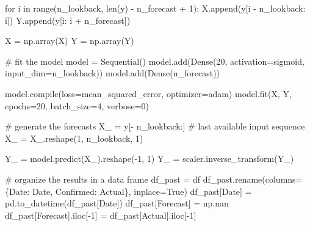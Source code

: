 \documentclass[
  us-letterpaper,
]{scrreprt}
\newenvironment{Shaded}{\begin{snugshade}}{\end{snugshade}}
\newcommand{\BuiltInTok}[1]{\textcolor[rgb]{0.00,0.23,0.31}{#1}}
\newcommand{\CommentTok}[1]{\textcolor[rgb]{0.37,0.37,0.37}{#1}}
\newcommand{\ControlFlowTok}[1]{\textcolor[rgb]{0.00,0.23,0.31}{#1}}
\newcommand{\DecValTok}[1]{\textcolor[rgb]{0.68,0.00,0.00}{#1}}
\newcommand{\KeywordTok}[1]{\textcolor[rgb]{0.00,0.23,0.31}{#1}}
\newcommand{\NormalTok}[1]{\textcolor[rgb]{0.00,0.23,0.31}{#1}}
\newcommand{\OperatorTok}[1]{\textcolor[rgb]{0.37,0.37,0.37}{#1}}
\newcommand{\StringTok}[1]{\textcolor[rgb]{0.13,0.47,0.30}{#1}}
\newcommand{\VariableTok}[1]{\textcolor[rgb]{0.07,0.07,0.07}{#1}}
\theoremstyle{plain}
\theoremstyle{definition}
\theoremstyle{definition}
\theoremstyle{plain}
\theoremstyle{remark}
\begin{document}
\begin{Shaded}
\begin{Highlighting}[]
\ControlFlowTok{for}\NormalTok{ i }\KeywordTok{in} \BuiltInTok{range}\NormalTok{(n\_lookback, }\BuiltInTok{len}\NormalTok{(y) }\OperatorTok{{-}}\NormalTok{ n\_forecast }\OperatorTok{+} \DecValTok{1}\NormalTok{):}
\NormalTok{    X.append(y[i }\OperatorTok{{-}}\NormalTok{ n\_lookback: i])}
\NormalTok{    Y.append(y[i: i }\OperatorTok{+}\NormalTok{ n\_forecast])}

\NormalTok{X }\OperatorTok{=}\NormalTok{ np.array(X)}
\NormalTok{Y }\OperatorTok{=}\NormalTok{ np.array(Y)}

\CommentTok{\# fit the model}
\NormalTok{model }\OperatorTok{=}\NormalTok{ Sequential()}
\NormalTok{model.add(Dense(}\DecValTok{20}\NormalTok{, activation}\OperatorTok{=}\StringTok{\textquotesingle{}sigmoid\textquotesingle{}}\NormalTok{, input\_dim}\OperatorTok{=}\NormalTok{n\_lookback))}
\NormalTok{model.add(Dense(n\_forecast))}

\NormalTok{model.}\BuiltInTok{compile}\NormalTok{(loss}\OperatorTok{=}\StringTok{\textquotesingle{}mean\_squared\_error\textquotesingle{}}\NormalTok{, optimizer}\OperatorTok{=}\StringTok{\textquotesingle{}adam\textquotesingle{}}\NormalTok{)}
\NormalTok{model.fit(X, Y, epochs}\OperatorTok{=}\DecValTok{20}\NormalTok{, batch\_size}\OperatorTok{=}\DecValTok{4}\NormalTok{, verbose}\OperatorTok{=}\DecValTok{0}\NormalTok{)}

\CommentTok{\# generate the forecasts}
\NormalTok{X\_ }\OperatorTok{=}\NormalTok{ y[}\OperatorTok{{-}}\NormalTok{ n\_lookback:]  }\CommentTok{\# last available input sequence}
\NormalTok{X\_ }\OperatorTok{=}\NormalTok{ X\_.reshape(}\DecValTok{1}\NormalTok{, n\_lookback, }\DecValTok{1}\NormalTok{)}

\NormalTok{Y\_ }\OperatorTok{=}\NormalTok{ model.predict(X\_).reshape(}\OperatorTok{{-}}\DecValTok{1}\NormalTok{, }\DecValTok{1}\NormalTok{)}
\NormalTok{Y\_ }\OperatorTok{=}\NormalTok{ scaler.inverse\_transform(Y\_)}

\CommentTok{\# organize the results in a data frame}
\NormalTok{df\_past }\OperatorTok{=}\NormalTok{ df}
\NormalTok{df\_past.rename(columns}\OperatorTok{=}\NormalTok{\{}\StringTok{\textquotesingle{}Date\textquotesingle{}}\NormalTok{: }\StringTok{\textquotesingle{}Date\textquotesingle{}}\NormalTok{, }\StringTok{\textquotesingle{}Confirmed\textquotesingle{}}\NormalTok{: }\StringTok{\textquotesingle{}Actual\textquotesingle{}}\NormalTok{\}, inplace}\OperatorTok{=}\VariableTok{True}\NormalTok{)}
\NormalTok{df\_past[}\StringTok{\textquotesingle{}Date\textquotesingle{}}\NormalTok{] }\OperatorTok{=}\NormalTok{ pd.to\_datetime(df\_past[}\StringTok{\textquotesingle{}Date\textquotesingle{}}\NormalTok{])}
\NormalTok{df\_past[}\StringTok{\textquotesingle{}Forecast\textquotesingle{}}\NormalTok{] }\OperatorTok{=}\NormalTok{ np.nan}
\NormalTok{df\_past[}\StringTok{\textquotesingle{}Forecast\textquotesingle{}}\NormalTok{].iloc[}\OperatorTok{{-}}\DecValTok{1}\NormalTok{] }\OperatorTok{=}\NormalTok{ df\_past[}\StringTok{\textquotesingle{}Actual\textquotesingle{}}\NormalTok{].iloc[}\OperatorTok{{-}}\DecValTok{1}\NormalTok{]}


\end{Highlighting}
\end{Shaded}
\end{document}
